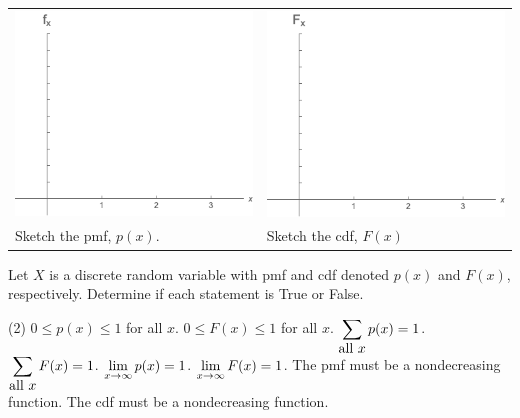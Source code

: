 \begin{center}
\begin{tabular}{ll}
\includegraphics[width=0.3\tw]{04/04-blank-pmf.png} \hspace{1in} &
\includegraphics[width=0.3\tw]{04/04-blank-cdf.png} \\
Sketch the pmf, $p(x)$. & Sketch the cdf, $F(x)$\\
\end{tabular}
\end{center}

\ii Let $X$ is a discrete random variable with pmf and cdf denoted $p(x)$ and $F(x)$, respectively. Determine if each statement is True or False.
\begin{tasks}[counter-format = {(tsk[a])},label-offset = {0.8em},label-format = {\color{black}}](2)
\task $0 \leq p(x) \leq 1$ for all $x$.
\task $0 \leq F(x) \leq 1$ for all $x$. \vspace{0.45in}
\task $\displaystyle \sum_{\mbox{all $x$}} p(x) = 1$.
\task $\displaystyle \sum_{\mbox{all $x$}} F(x) = 1$. \vspace{0.45in}
\task $\displaystyle \lim_{x \to \infty} p(x) = 1$.
\task $\displaystyle \lim_{x \to \infty} F(x) = 1$. \vspace{0.45in}
\task The pmf must be a nondecreasing function.
\task The cdf must be a nondecreasing function. \vspace{0.45in}
\end{tasks}
\ee

